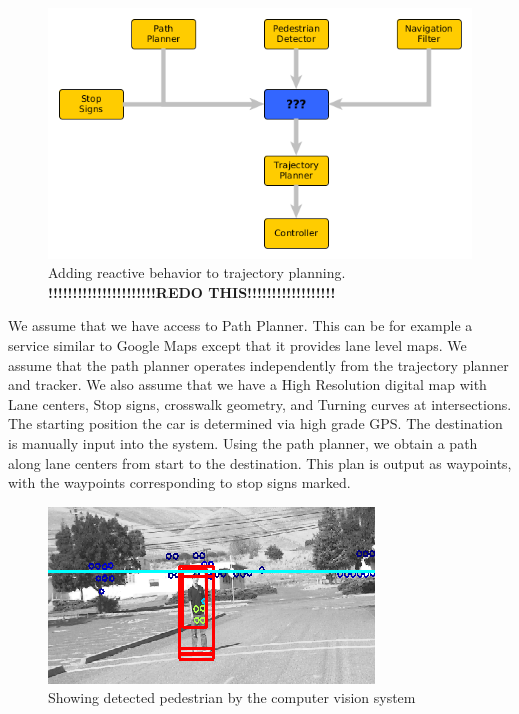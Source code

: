 \documentclass[letterpaper, 10 pt, conference]{ieeeconf}  %
\begin{document}
\begin{figure}[thpb]
  \centering
  \includegraphics[width=1.0\columnwidth]{graphics/MissingReactionPiece2.png}
  \caption{
    Adding reactive behavior to trajectory planning.
    \newline
    \textbf{!!!!!!!!!!!!!!!!!!!!!!REDO THIS!!!!!!!!!!!!!!!!!!}
  }
  \label{fig:addreact}
\end{figure}

We assume that we have access to Path Planner. This can be for example a service similar to
Google Maps except that it provides lane level maps. 
We assume that the path planner operates independently from the trajectory planner and tracker.
We also assume that we have a High
Resolution digital map with Lane centers, Stop signs, crosswalk geometry, and Turning 
curves at intersections. The starting position the 
car is determined via high grade GPS. The destination is manually input into the system.
Using the path planner, we obtain a path along lane centers from start to the destination.
This plan is output as waypoints, with the waypoints corresponding to stop signs marked.

\begin{figure}[thpb]
  \centering
  \includegraphics[width=0.5\columnwidth]{graphics/ped3.png}
  \caption{Showing detected pedestrian by the computer vision system
  \newline
  }
  \label{fig:ped}
\end{figure}
\end{document}
